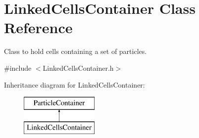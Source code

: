 \hypertarget{classLinkedCellsContainer}{}\section{Linked\+Cells\+Container Class Reference}
\label{classLinkedCellsContainer}


Class to hold cells containing a set of particles.  




{\ttfamily \#include $<$Linked\+Cells\+Container.\+h$>$}

Inheritance diagram for Linked\+Cells\+Container\+:\begin{figure}[H]
\begin{center}
\leavevmode
\includegraphics[height=2.000000cm]{classLinkedCellsContainer}
\end{center}
\end{figure}
